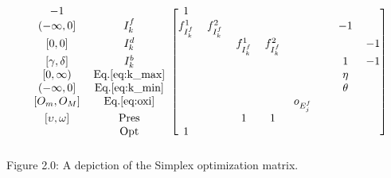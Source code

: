 \begin{equation*}
\begin{blockarray}{cccccccccc}
\begin{block}{cc[cccccccc]}
            -1                 &                   & 1                 &
             \\
            {(-\infty,0]}      & I_{k}^{f}         & f_{I_{k}^{f}}^{1} &
            f_{I_{k}^{f}}^{2}  &                   &                   &
                               &                   & -1                &
             \\
            {[0,0]}            & I_{k}^{d}         &                   &
                               & f_{I_{k}^{f}}^{1} & f_{I_{k}^{f}}^{2} &
                               &                   &                   &
            -1 \\
            {[\gamma, \delta]}
                               & I_{k}^{b}         &                   &
                               &                   &                   &
                               &                   & 1                 &
            -1 \\ 
            {[0, \infty)}      & \text{Eq.}\ref{eq:k_max}&             &
                               &                   &                   &
                               &                   & \eta             &
             \\
            {(-\infty, 0]}     & \text{Eq.}\ref{eq:k_min} &            &
                               &                   &                   &
                               &                   & \theta            & 
             \\
            {[O_{m},O_{M}]}    & \text{Eq.}\ref{eq:oxi} &              &
                               &                   &                   &
             o_{E_{j}^{f}}     &                   &                   &
             \\
            {[\upsilon,\omega]} & \text{Pres}      &                   &
                               & 1                 & 1                 &
                               &                   &                   &
             \\
                               & \text{Opt}        & 1                 &
                               &                   &                   &
                               &                   &                   &
             \\
            \end{block}
        \end{blockarray}
    \end{equation*}
    Figure 2.0: A depiction of the Simplex optimization matrix.

